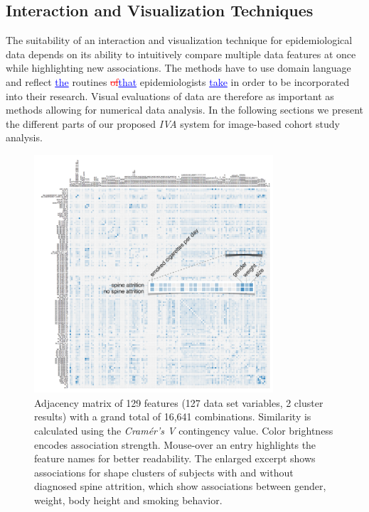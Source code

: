 \documentclass[journal]{style/vgtc} 			          %
\newcommand{\rem}[1]{\textcolor{red}{\sout{#1}}}
\newcommand{\add}[1]{\textcolor{blue}{\uline{#1}}}
\begin{document}
\subsection{Interaction and Visualization Techniques} \label{Interaction- and Visualization Techniques}
%
The suitability of an interaction and visualization technique for epidemiological data depends on its ability to intuitively compare multiple data features at once while highlighting new associations.
%
The methods have to use domain language and reflect \add{the} routines \rem{of}\add{that} epidemiologists \add{take} in order to be incorporated into their research.
%
Visual evaluations of data are therefore as important as methods allowing for numerical data analysis.
%
In the following sections we present the different parts of our proposed \emph{IVA} system for image-based cohort study analysis.

\begin{figure}[htb]
 \centering
 \includegraphics[width=3.5in]{figures/similarity_matrix}
 \caption{Adjacency matrix of 129 features (127 data set variables, 2 cluster results) with a grand total of 16,641 combinations.
 Similarity is calculated using the \emph{Cram\'{e}r's V} contingency value.
 Color brightness encodes association strength.
 Mouse-over an entry highlights the feature names for better readability.
 The enlarged excerpt shows associations for shape clusters of subjects with and without diagnosed spine attrition, which show associations between gender, weight, body height and smoking behavior.
 }
 \label{fig:similarity}
\end{figure}
\end{document}
